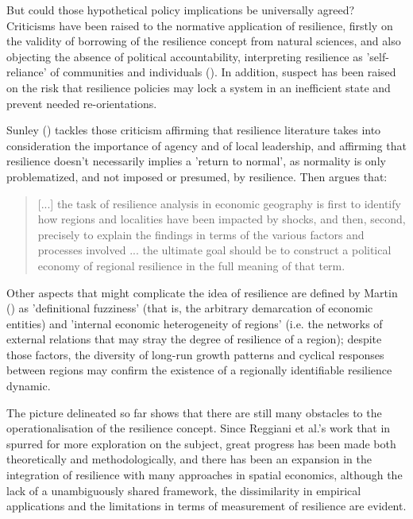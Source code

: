 \documentclass[12pt]{article}
\begin{document}
But could those hypothetical policy implications be universally agreed? Criticisms have been raised to the normative application of resilience, firstly on the validity of borrowing of the resilience concept from natural sciences, and also objecting the absence of political accountability, interpreting resilience as 'self-reliance' of communities and individuals (\cite{davoudi_resilience_2012}). In addition, suspect has been raised on the risk that resilience policies may lock a system in an inefficient state and prevent needed re-orientations.

Sunley (\citeyear{sunley_notion_2014}) tackles those criticism affirming that resilience literature takes into consideration the importance of agency and of local leadership, and affirming that resilience doesn't necessarily implies a 'return to normal', as normality is only problematized, and not imposed or presumed, by resilience. Then argues that: 
\begin{quote}
    [...] the task of resilience analysis in economic geography is first to identify how regions and localities have been impacted by shocks, and then, second, precisely to explain the findings in terms of the various factors and processes involved ... the ultimate goal should be to construct a political economy of regional resilience in the full meaning of that term.
\end{quote}

Other aspects that might complicate the idea of resilience are defined by Martin (\citeyear{martin_regional_2012}) as 'definitional fuzziness' (that is, the arbitrary demarcation of economic entities) and 'internal economic heterogeneity of regions' (i.e. the networks of external relations that may stray the degree of resilience of a region); despite those factors, the diversity of long-run growth patterns and cyclical responses between regions may confirm the existence of a regionally identifiable resilience dynamic.

The picture delineated so far shows that there are still many obstacles to the operationalisation of the resilience concept. Since Reggiani et al.'s work that in \citeyear{aura_reggiani_resilience_2001} spurred for more exploration on the subject, great progress has been made both theoretically and methodologically, and there has been an expansion in the integration of resilience with many approaches in spatial economics, although the lack of a unambiguously shared framework, the dissimilarity in empirical applications and the limitations in terms of measurement of resilience are evident.
\end{document}
